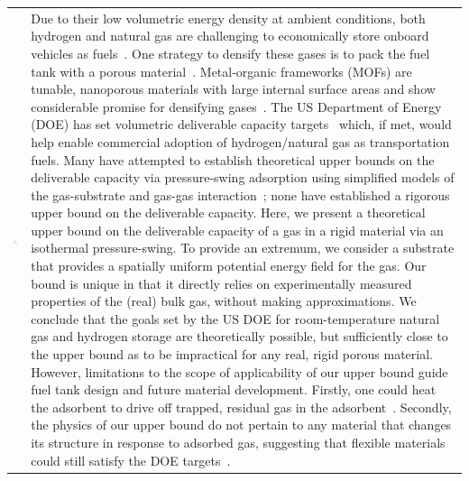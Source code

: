 \documentclass[twoside,twocolumn,9pt]{article}
\begin{document}
\begin{@twocolumnfalse}
\begin{tabular}{m{4.5cm} p{13.5cm} }
\includegraphics{head_foot/dates} & \noindent\normalsize{Due to their low volumetric energy density at ambient conditions, both hydrogen
and natural gas are challenging to economically store onboard vehicles as
fuels~\cite{mason2014evaluating, sircar2002pressure}. One strategy to densify
these gases is to pack the fuel tank with a porous
material~\cite{schoedel2016role}. Metal-organic frameworks (MOFs) are tunable,
nanoporous materials with large internal surface areas and show considerable
promise for densifying gases~\cite{makal2012methane,mason2014evaluating,
suh2011hydrogen,garcia2018benchmark, schoedel2016role}. The US Department of
Energy (DOE) has set volumetric deliverable capacity
targets~\cite{simon2015materials, h2targetsDOE} which, if met, would help
enable commercial adoption of hydrogen/natural gas as transportation fuels.
Many have attempted to establish theoretical upper bounds on the deliverable
capacity via pressure-swing adsorption using simplified models of the
gas-substrate and gas-gas interaction~\cite{gomez2014exploring,
gomez2017impact, kaija2018high, lee2019predicting}; none have established a
rigorous upper bound on the deliverable capacity. Here, we present a
theoretical upper bound on the deliverable capacity of a gas in a rigid
material via an isothermal pressure-swing. To provide an extremum, we consider
a substrate that provides a spatially uniform potential energy field for the
gas. Our bound is unique in that it directly relies on experimentally measured
properties of the (real) bulk gas, without making approximations. We conclude
that the goals set by the US DOE for room-temperature natural gas and hydrogen
storage are theoretically possible, but sufficiently close to the upper bound
as to be impractical for any real, rigid porous material. However, limitations
to the scope of applicability of our upper bound guide fuel tank design and
future material development. Firstly, one could heat the adsorbent to drive off
trapped, residual gas in the adsorbent~\cite{gomez2014exploring}. Secondly, the
physics of our upper bound do not pertain to any material that changes its
structure in response to adsorbed gas, suggesting that flexible materials could
still satisfy the DOE targets~\cite{schneemann2014flexible, choi2008broadly,
mason2015methane}}.


\end{tabular}

 \end{@twocolumnfalse} \vspace{0.6cm}
\end{document}
